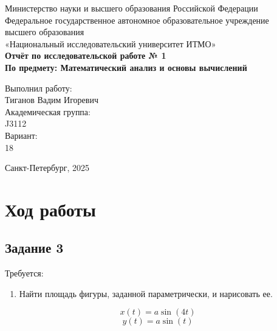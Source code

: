 \documentclass[a4paper,12pt]{article}
\begin{document}
\thispagestyle{empty}
\begin{center}
    \large
    Министерство науки и высшего образования Российской Федерации\\
    Федеральное государственное автономное образовательное учреждение\\
    высшего образования\\
    «Национальный исследовательский университет ИТМО»\\
    \vspace{5cm}
    \textbf{Отчёт по исследовательской работе № 1}\\
    \textbf{По предмету: Математический анализ и основы вычислений}\\
    \vspace{6cm}
    \begin{flushright}
        Выполнил работу:\\ Тиганов Вадим Игоревич\\
        \vspace{1cm}
        Академическая группа: \\ J3112\\
        \vspace{1cm}
        Вариант: \\18
    \end{flushright}
    \vspace{1cm}
    \vspace{3cm}
    \begin{center}
        Санкт-Петербург, 2025\\
    \end{center}
\end{center}

\newpage


\section{Ход работы}


\subsection{Задание 3}

Требуется:
\begin{enumerate}
    \item Найти площадь фигуры, заданной параметрически, и нарисовать ее.
\end{enumerate}

\[
x(t) = a \sin(4t)
\]
\[
y(t) = a \sin(t)
\]
\end{document}
